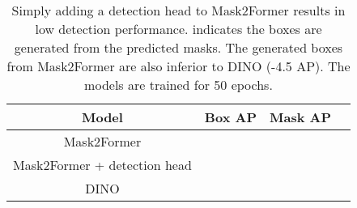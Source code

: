 \documentclass[10pt,twocolumn,letterpaper]{article}
\begin{document}
\begin{table*}[t]
\begin{adjustbox}{width=0.99\textwidth,center}
\begin{minipage}[t]{0.55\textwidth}
\makeatletter{}
\centering
\begin{tabular}{c|ccc}
    \toprule
    Model & Box AP & Mask AP  \\
        \midrule
        Mask2Former &  &      \\
        \midrule
        Mask2Former + detection head&&\\
        \midrule
     DINO     &    &   \\
    
    \bottomrule
\end{tabular}
\caption{Simply adding a detection head to Mask2Former results in low detection performance.  indicates the boxes are generated from the predicted masks. The generated boxes from Mask2Former are also inferior to DINO (-4.5 AP). The models are trained for 50 epochs.
}
\label{tab:mask2former_head}
\end{minipage}\hspace{3mm}


\end{adjustbox}
\end{table*}
\end{document}
